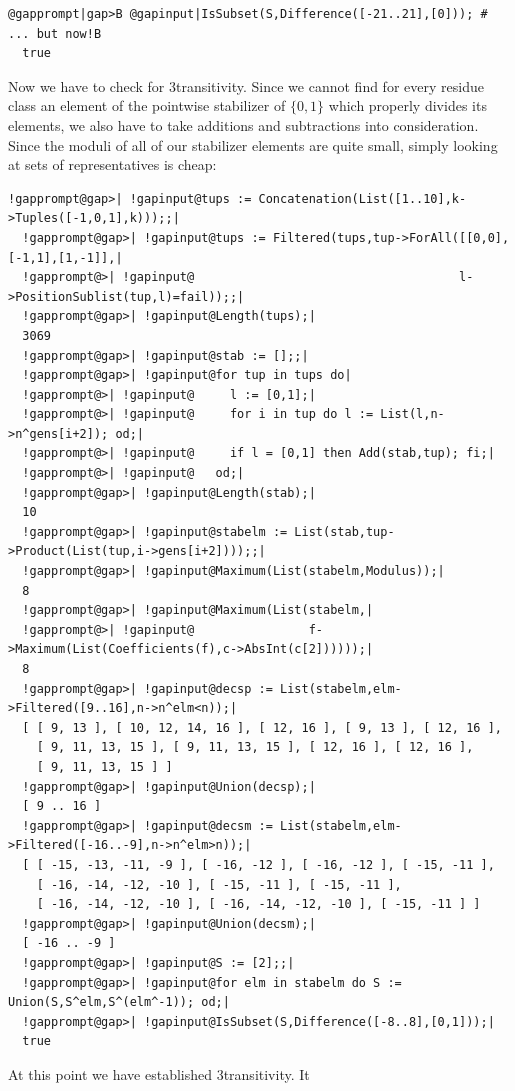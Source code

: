 \documentclass[a4paper,11pt]{report}
\begin{document}
{{\begin{Verbatim}[commandchars=@|B,fontsize=\small,frame=single,label=Example]
  @gapprompt|gap>B @gapinput|IsSubset(S,Difference([-21..21],[0])); # ... but now!B
  true
\end{Verbatim}
 Now we have to check for 3\texttt{}transitivity. Since we cannot
find for every residue class an element of the pointwise stabilizer of $\{0,1\}$ which properly divides its elements, we also have to take additions and
subtractions into consideration. Since the moduli of all of our stabilizer
elements are quite small, simply looking at sets of representatives is cheap: 
\begin{Verbatim}[commandchars=!@|,fontsize=\small,frame=single,label=Example]
  !gapprompt@gap>| !gapinput@tups := Concatenation(List([1..10],k->Tuples([-1,0,1],k)));;|
  !gapprompt@gap>| !gapinput@tups := Filtered(tups,tup->ForAll([[0,0],[-1,1],[1,-1]],|
  !gapprompt@>| !gapinput@                                     l->PositionSublist(tup,l)=fail));;|
  !gapprompt@gap>| !gapinput@Length(tups);|
  3069
  !gapprompt@gap>| !gapinput@stab := [];;|
  !gapprompt@gap>| !gapinput@for tup in tups do|
  !gapprompt@>| !gapinput@     l := [0,1];|
  !gapprompt@>| !gapinput@     for i in tup do l := List(l,n->n^gens[i+2]); od;|
  !gapprompt@>| !gapinput@     if l = [0,1] then Add(stab,tup); fi;|
  !gapprompt@>| !gapinput@   od;|
  !gapprompt@gap>| !gapinput@Length(stab);|
  10
  !gapprompt@gap>| !gapinput@stabelm := List(stab,tup->Product(List(tup,i->gens[i+2])));;|
  !gapprompt@gap>| !gapinput@Maximum(List(stabelm,Modulus));|
  8
  !gapprompt@gap>| !gapinput@Maximum(List(stabelm,|
  !gapprompt@>| !gapinput@                f->Maximum(List(Coefficients(f),c->AbsInt(c[2])))));|
  8
  !gapprompt@gap>| !gapinput@decsp := List(stabelm,elm->Filtered([9..16],n->n^elm<n));|
  [ [ 9, 13 ], [ 10, 12, 14, 16 ], [ 12, 16 ], [ 9, 13 ], [ 12, 16 ], 
    [ 9, 11, 13, 15 ], [ 9, 11, 13, 15 ], [ 12, 16 ], [ 12, 16 ], 
    [ 9, 11, 13, 15 ] ]
  !gapprompt@gap>| !gapinput@Union(decsp);|
  [ 9 .. 16 ]
  !gapprompt@gap>| !gapinput@decsm := List(stabelm,elm->Filtered([-16..-9],n->n^elm>n));|
  [ [ -15, -13, -11, -9 ], [ -16, -12 ], [ -16, -12 ], [ -15, -11 ], 
    [ -16, -14, -12, -10 ], [ -15, -11 ], [ -15, -11 ], 
    [ -16, -14, -12, -10 ], [ -16, -14, -12, -10 ], [ -15, -11 ] ]
  !gapprompt@gap>| !gapinput@Union(decsm);|
  [ -16 .. -9 ]
  !gapprompt@gap>| !gapinput@S := [2];;|
  !gapprompt@gap>| !gapinput@for elm in stabelm do S := Union(S,S^elm,S^(elm^-1)); od;|
  !gapprompt@gap>| !gapinput@IsSubset(S,Difference([-8..8],[0,1]));|
  true
\end{Verbatim}
 At this point we have established 3\texttt{}transitivity. It
}}
\end{document}
